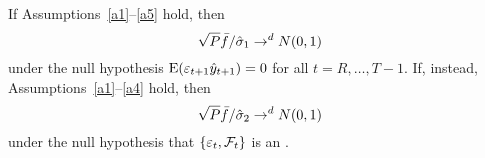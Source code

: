 If Assumptions~\ref{a1}--\ref{a5} hold, then
\begin{equation*}
  \sqrt{P} \bar{f} / \hat\sigma_1 \to^d N(0, 1)
\end{equation*}
under the null hypothesis  $\operatorname{E}(\varepsilon_{t+1} \hat{y}_{t+1}) = 0$ for all $t = R,\dots,T-1$.
If, instead, Assumptions~\ref{a1}--\ref{a4} hold, then
\begin{equation*}
  \sqrt{P} \bar{f} / \hat\sigma_2 \to^d N(0, 1)
\end{equation*}
under the null hypothesis that $\{\varepsilon_t, \mathcal{F}_t\}$ is an \mds.
